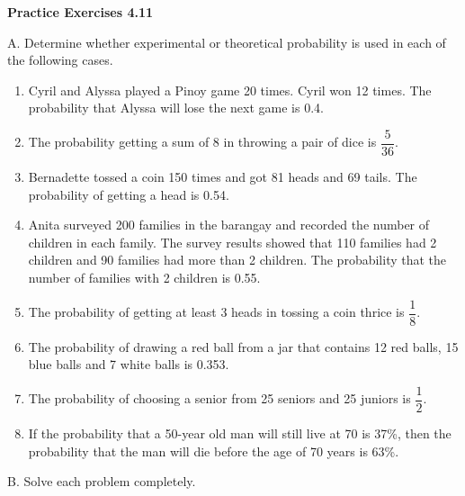  \vspace{0.3ex}
\noindent\textbf{Practice Exercises 4.11}

\vspace{0.2ex}


A. Determine whether experimental or theoretical probability is used in each of the following cases.  
\begin{enumerate} 
\item Cyril and Alyssa played a Pinoy game 20 times. Cyril won 12 times. The probability that Alyssa will lose the next game is 0.4.
\item The probability getting a sum of 8 in throwing a pair of dice is $\dfrac{5}{36}$. 
\item Bernadette tossed a coin 150 times and got 81 heads and 69 tails. The probability of getting a head is 0.54.
\item Anita surveyed 200 families in the barangay and recorded the number of children in each family. The survey results showed that 110 families had 2 children and 90 families had more than 2 children. The probability that the number of families with 2 children is 0.55.
\item The probability of getting at least 3 heads in tossing a coin thrice is $\dfrac{1}{8}$. 
\item The probability of drawing a red ball from a jar that contains 12 red balls, 15 blue balls and 7 white balls is 0.353.
\item The probability of choosing a senior from 25 seniors and 25 juniors is $\dfrac{1}{2} $. 
\item If the probability that a 50-year old man will still live at 70 is 37\%, then the probability that the man will die before the age of 70 years is 63\%.
\end{enumerate}

B. Solve each problem completely.

